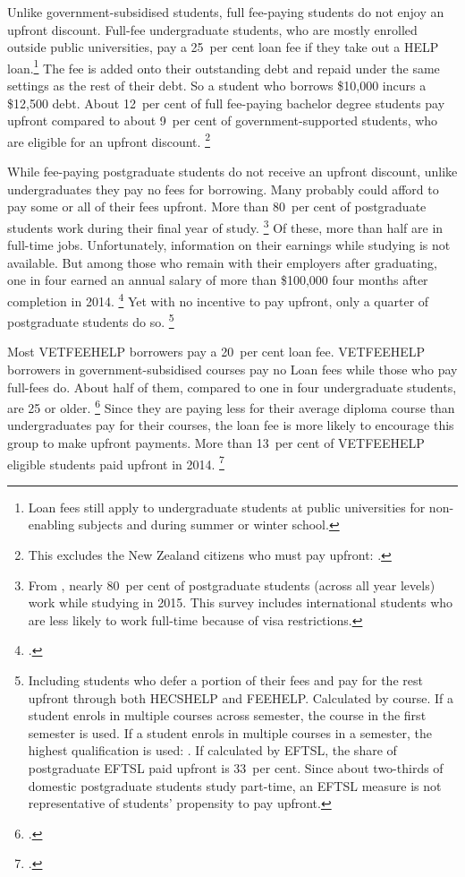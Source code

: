 \documentclass[embargoed]{grattan}
\begin{document}
Unlike government-subsidised students, full fee-paying students do not enjoy an upfront discount.
Full-fee undergraduate students, who are mostly enrolled outside public universities, pay a 25~per cent loan fee if they take out a \gls{HELP} loan.\footnote{\Gls{Loan fees} still apply to undergraduate students at public universities for non-enabling subjects and during summer or winter school.} The fee is added onto their outstanding debt and repaid under the same settings as the rest of their debt.
So a student who borrows \$10,000 incurs a \$12,500 debt.
About 12~per cent of full fee-paying bachelor degree students pay upfront compared to about 9~per cent of government-supported students, who are eligible for an upfront discount.%
\footnote{This excludes the New Zealand citizens who must pay upfront: \textcite{EducationvariousyearsHigherEducationStatistics}.}

While fee-paying postgraduate students do not receive an upfront discount, unlike undergraduates they pay no fees for borrowing.
Many probably could afford to pay some or all of their fees upfront.
More than 80~per cent of postgraduate students work during their final year of study.%
\footnote{From \textcite{ABS2016MicrodataEducationwork}, nearly 80~per cent of postgraduate students (across all year levels) work while studying in 2015.
This survey includes international students who are less likely to work full-time because of visa restrictions.} 
Of these, more than half are in full-time jobs.
Unfortunately, information on their earnings while studying is not available.
But among those who remain with their employers after graduating, one in four earned an annual salary of more than \$100,000 four months after completion in 2014.%
\footcite{GCA2015AustralianGraduateSurvey} %
Yet with no incentive to pay upfront, only a quarter of postgraduate students do so.%
\footnote{Including students who defer a portion of their fees and pay for the rest upfront through both \gls{HECSHELP} and \gls{FEEHELP}\@.
Calculated by course.
If a student enrols in multiple courses across semester, the course in the first semester is used.
If a student enrols in multiple courses in a semester, the highest qualification is used: \textcite{EducationvariousyearsHigherEducationStatistics}.
If calculated by \gls{EFTSL}, the share of postgraduate \gls{EFTSL} paid upfront is 33~per cent.
Since about two-thirds of domestic postgraduate students study part-time, an \gls{EFTSL} measure is not representative of students' propensity to pay upfront.}

Most \gls{VETFEEHELP} borrowers pay a 20~per cent loan fee.
\gls{VETFEEHELP} borrowers in government-subsidised courses pay no \gls{Loan fees} while those who pay full-fees do.
About half of them, compared to one in four undergraduate students, are 25 or older.%
\footcites[][Table~1]{Education20152014VETFEEa}[][Table~2.1]{Education2015StudentsSelectedhigher} %
Since they are paying less for their average diploma course than undergraduates pay for their courses, the loan fee is more likely to encourage this group to make upfront payments.
More than 13~per cent of \gls{VETFEEHELP} eligible students paid upfront in 2014.%
\footcite{Education2014VETFEEHELP}
\end{document}
